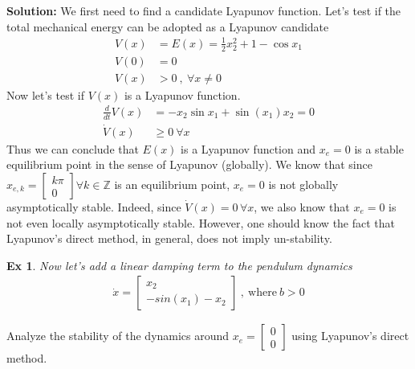\documentclass[twoside]{article}
\newtheorem{exmp}[theorem]{Ex}
\begin{document}
\textbf{Solution:} We first need to find a candidate Lyapunov function. Let's test if
the total mechanical energy can be adopted as a Lyapunov candidate
%
\begin{align*}
V(x) &= E(x) = \frac{1}{2} x_2^2 + 1 - \cos{x_1}  \\ 
V(0) &= 0 \\
V(x) &> 0 \ , \ \forall x \neq 0
\end{align*}
%
Now let's test if $V(x)$ is a Lyapunov function.
%
\begin{align*}
\frac{d}{dt} V(x) &= - x_2 \sin x_1 + \sin(x_1) x_2 = 0
\\
\dot{V}(x) &\geq 0 \ \forall x 
\end{align*}
%
Thus we can conclude that $E(x)$ is a Lyapunov function and $x_e = 0$
is a stable equilibrium point in the sense of Lyapunov (globally). We know that since 
$x_{e,k} = \begin{bmatrix} k \pi \\ 0 \end{bmatrix} \forall k \in \mathbb{Z}$
is an equilibrium point, $x_e = 0$ is not globally asymptotically stable. 
Indeed, since $\dot{V}(x) = 0 \, \forall x $, we also know 
that $x_e = 0$ is not even locally asymptotically stable. However, one should
know the fact that Lyapunov's direct method, in general, does not imply 
un-stability.

\begin{exmp}
    Now let's add a linear damping term to the pendulum dynamics
    \begin{align*}
    \dot{x} = \begin{bmatrix} x_2 \\ -sin(x_1) - x_2 \end{bmatrix} \ , \ \mathrm{where} \ b > 0
\end{align*}
\end{exmp}
Analyze the stability of the dynamics around $x_e = \begin{bmatrix} 0 \\ 0 \end{bmatrix}$ using Lyapunov's direct method.
\end{document}

